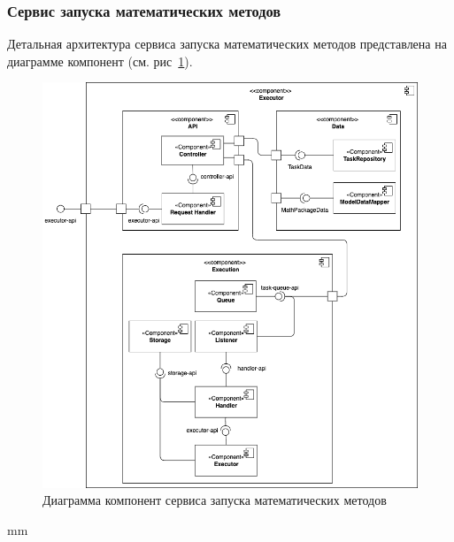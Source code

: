 \subsubsection{\large{Сервис запуска математических методов}}

Детальная архитектура сервиса запуска математических методов представлена на диаграмме компонент
(см. рис\ \ref{pic:architecture__executor-component}).

\begin{figure}[H]
	\hspace*{-2.5 cm}\includegraphics[width=\textwidth]{architecture/pictures/executor/component}
	\caption{Диаграмма компонент сервиса запуска математических методов}
	\label{pic:architecture__executor-component}
\end{figure}
 mm

